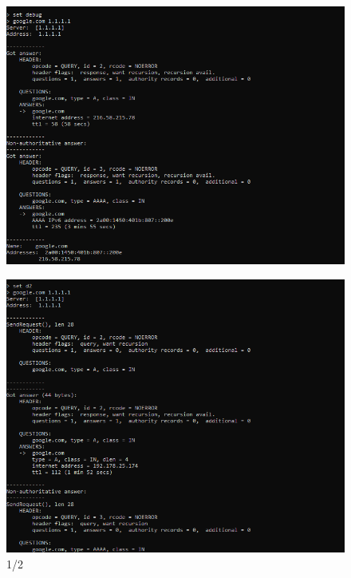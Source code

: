 \documentclass{article}
\begin{document}
\begin{normalsize}
\begin{figure}[H]
	\centering
	\includegraphics[width=\textwidth]{33}
	\caption{}
\end{figure}

\begin{figure}[H]
	\centering
	\includegraphics[width=\textwidth]{34}
	\caption{1/2}
\end{figure}


\end{normalsize}
\end{document}
